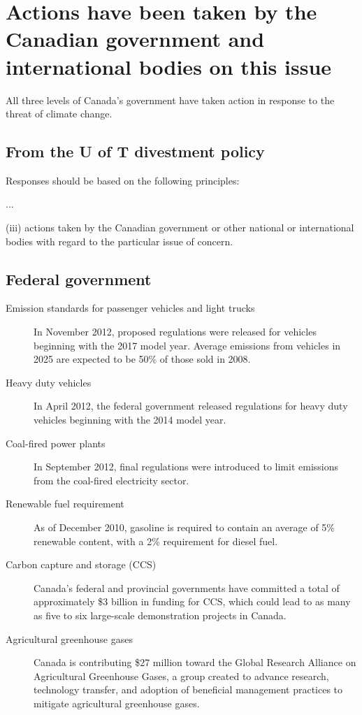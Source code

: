 


	
	
		\section{Actions have been taken by the Canadian government and international bodies on this issue}



All three levels of Canada's government have taken action in response to the threat of climate change.

		\subsection{From the U of T divestment policy}


\begin{itquote}	
Responses should be based on the following principles:

...

(iii) actions taken by the Canadian government or other national or international bodies with regard to the particular issue of concern.
\end{itquote}


		
		\subsection{Federal government}
		
		
		
\begin{description}
	\item[Emission standards for passenger vehicles and light trucks] In November 2012, proposed regulations were released for vehicles beginning with the 2017 model year. 
	Average emissions from vehicles in 2025 are expected to be 50\% of those sold in 2008.
	\item[Heavy duty vehicles] In April 2012, the federal government released regulations for heavy duty vehicles beginning with the 2014 model year.
	\item[Coal-fired power plants] In September 2012, final regulations were introduced to limit emissions from the coal-fired electricity sector.
	\item[Renewable fuel requirement] As of December 2010, gasoline is required to contain an average of 5\% renewable content, with a 2\% requirement for diesel fuel.
	\item[Carbon capture and storage (CCS)] Canada's federal and provincial governments have committed a total of approximately \$3 billion in funding for CCS, which could lead to as many as five to six large-scale demonstration projects in Canada.
	\item[Agricultural greenhouse gases] Canada is contributing \$27 million toward the Global Research Alliance on Agricultural Greenhouse Gases, a group created to advance research, technology transfer, and adoption of beneficial management practices to mitigate agricultural greenhouse gases.
\end{description}		
		
